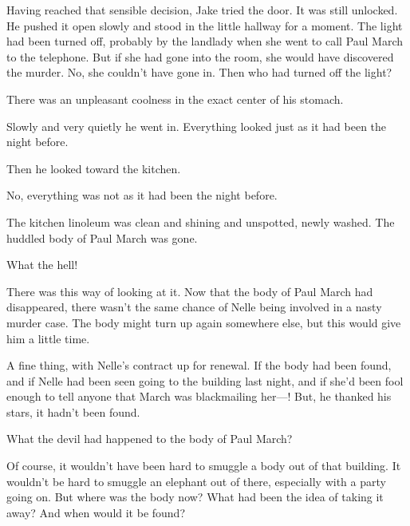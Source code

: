 \documentclass{novel}
\begin{document}
Having reached that sensible decision, Jake tried the door. It was still unlocked. He pushed it open slowly and stood in the little hallway for a moment. The light had been turned off, probably by the landlady when she went to call Paul March to the telephone. But if she had gone into the room, she would have discovered the murder. No, she couldn’t have gone in. Then who had turned off the light?

There was an unpleasant coolness in the exact center of his stomach.

Slowly and very quietly he went in. Everything looked just as it had been the night before.

Then he looked toward the kitchen.

No, everything was not as it had been the night before.

The kitchen linoleum was clean and shining and unspotted, newly washed. The huddled body of Paul March was gone.

\vspace{2\nbs}
\clearpage
\thispagestyle{empty}

\begin{ChapterStart}
\vspace{3\nbs}
\end{ChapterStart}

What the hell!

There was this way of looking at it. Now that the body of Paul March had disappeared, there wasn’t the same chance of Nelle being involved in a nasty murder case. The body might turn up again somewhere else, but this would give him a little time.

A fine thing, with Nelle’s contract up for renewal. If the body had been found, and if Nelle had been seen going to the building last night, and if she’d been fool enough to tell anyone that March was blackmailing her—! But, he thanked his stars, it hadn’t been found.

What the devil had happened to the body of Paul March?

Of course, it wouldn’t have been hard to smuggle a body out of that building. It wouldn’t be hard to smuggle an elephant out of there, especially with a party going on. But where was the body now? What had been the idea of taking it away? And when would it be found?
\end{document}
